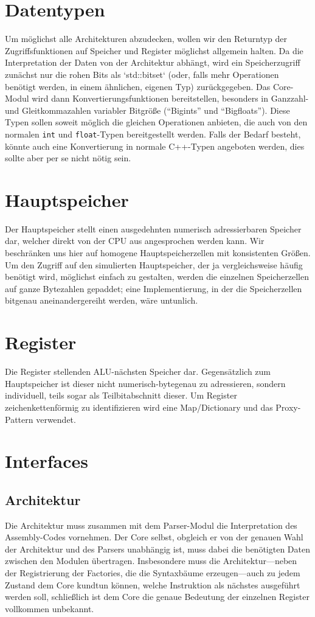 \section{Datentypen}

Um möglichst alle Architekturen abzudecken, wollen wir den Returntyp der Zugriffsfunktionen auf Speicher und Register möglichst allgemein halten. Da die Interpretation der Daten von der Architektur abhängt, wird ein Speicherzugriff zunächst nur die rohen Bits als `std::bitset` (oder, falls mehr Operationen benötigt werden, in einem ähnlichen, eigenen Typ) zurückgegeben. Das Core-Modul wird dann Konvertierungsfunktionen bereitstellen, besonders in Ganzzahl- und Gleitkommazahlen variabler Bitgrö{\ss}e (``Bigints'' und ``Bigfloats''). Diese Typen sollen soweit möglich die gleichen Operationen anbieten, die auch von den normalen \lstinline!int! und \lstinline!float!-Typen bereitgestellt werden. Falls der Bedarf besteht, könnte auch eine Konvertierung in normale C++-Typen angeboten werden, dies sollte aber per se nicht nötig sein.


\section{Hauptspeicher}
Der Hauptspeicher stellt einen ausgedehnten numerisch adressierbaren Speicher dar, welcher direkt von der CPU aus angesprochen werden kann. Wir beschränken uns hier auf homogene Hauptspeicherzellen mit konsistenten Grö{\ss}en. Um den Zugriff auf den simulierten Hauptspeicher, der ja vergleichsweise häufig benötigt wird, möglichst einfach zu gestalten, werden die einzelnen Speicherzellen auf ganze Bytezahlen gepaddet; eine Implementierung, in der die Speicherzellen bitgenau aneinandergereiht werden, wäre untunlich.

\section{Register}
Die Register stellenden ALU-nächsten Speicher dar. Gegensätzlich zum Hauptspeicher ist dieser nicht numerisch-bytegenau zu adressieren, sondern individuell, teils sogar als Teilbitabschnitt dieser.  Um Register zeichenkettenförmig zu identifizieren wird eine Map/Dictionary und das Proxy-Pattern verwendet.

\section{Interfaces}

\subsection{Architektur}
Die Architektur muss zusammen mit dem Parser-Modul die Interpretation des Assembly-Codes vornehmen. Der Core selbst, obgleich er von der genauen Wahl der Architektur und des Parsers unabhängig ist, muss dabei die benötigten Daten zwischen den Modulen übertragen. Insbesondere muss die Architektur---neben der Registrierung der Factories, die die Syntaxbäume erzeugen---auch zu jedem Zustand dem Core kundtun können, welche Instruktion als nächstes ausgeführt werden soll, schließlich ist dem Core die genaue Bedeutung der einzelnen Register vollkommen unbekannt.

